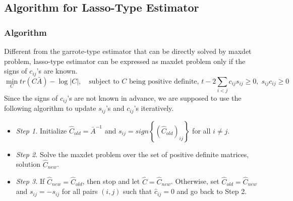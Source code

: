 \documentclass[11pt]{article} %
\begin{document}
\subsection{Algorithm for Lasso-Type Estimator}
\subsubsection{Algorithm}
Different from the garrote-type estimator that can be directly solved by maxdet problem, lasso-type estimator can be expressed as maxdet problem only if the signs of $c_{ij}$'s are known. 
\[\min_C tr(C\bar{A})-\log|C|,\quad \mbox{subject to }C\mbox{ being positive definite, }t-2\sum_{i<j}c_{ij}s_{ij}\geq 0,\; s_{ij}c_{ij}\geq 0\]
Since the signs of $c_{ij}$'s are not known in advance, we are supposed to use the following algorithm to update $s_{ij}$'s and $c_{ij}$'s iteratively. 
\begin{itemize}
\item \emph{Step 1.} Initialize $\hat{C}_{old}=\bar{A}^{-1}$ and $s_{ij}=sign\left\lbrace (\hat{C}_{old})_{ij}\right\rbrace $ for all $i\neq j$.
\item \emph{Step 2.} Solve the maxdet problem over the set of positive definite matrices, solution $\hat{C}_{new}$. 
\item \emph{Step 3.} If $\hat{C}_{new}=\hat{C}_{old}$, then stop and let $\hat{C}=\hat{C}_{new}$. Otherwise, set $\hat{C}_{old}=\hat{C}_{new}$ and $s_{ij}=-s_{ij}$ for all pairs $(i,j)$ such that $\hat{c}_{ij}=0$ and go back to Step 2.
\end{itemize}
\end{document}
